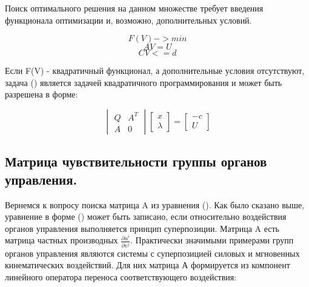 \documentclass[a4paper]{article}
\begin{document}
Поиск оптимального решения на данном множестве требует введения функционала оптимизации и, возможно, дополнительных условий.

\begin{equation}F(V) -> min\end{equation}
\begin{equation}AV = U\end{equation}
\begin{equation}CV <= d\end{equation}

Если F(V) - квадратичный функционал, а дополнительные условия отсутствуют, задача () является задачей квадратичного программирования и может быть разрешена в форме:

\begin{equation}
\begin{vmatrix}
Q & A^T\\
A & 0
\end{vmatrix}
\begin{bmatrix}
x\\
\lambda
\end{bmatrix}
=
\begin{bmatrix}
-c\\
U
\end{bmatrix}
\end{equation}

\subsection{Матрица чувствительности группы органов управления.}
Вернемся к вопросу поиска матрица A из уравнения (). Как было сказано выше, уравнение в форме () может быть записано, если относительно воздействия органов управления выполняется принцип суперпозиции. Матрица A есть матрица частных производных $\frac{\partial{u^i}}{\partial{v^j}}$. Практически значимыми примерами групп органов управления являются системы с суперпозицией силовых и мгновенных кинематических воздействий. Для них матрица А формируется из компонент линейного оператора переноса соответствующего воздействия:
\end{document}
